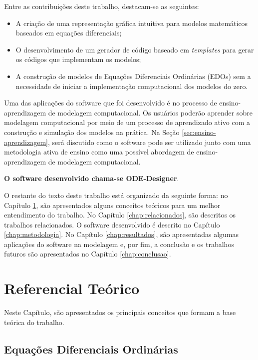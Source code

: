 \documentclass[
	12pt,				%
	openright,			%
	oneside,			%
	a4paper,			%
	main=brazil,
	english,			%
	]{ufsj-abntex2}
\begin{document}
Entre as contribuições deste trabalho, destacam-se as seguintes: 

\begin{itemize}
    \item A criação de uma representação gráfica intuitiva para modelos matemáticos baseados em equações diferenciais; 
    \item O desenvolvimento de um gerador de código baseado em \textit{templates} para gerar os códigos que implementam os modelos; 
    \item A construção de modelos de Equações Diferenciais Ordinárias (EDOs) sem a necessidade de iniciar a implementação computacional dos modelos do zero.
\end{itemize}

Uma das aplicações do software que foi desenvolvido é no processo de ensino-aprendizagem de modelagem computacional. Os usuários poderão aprender sobre modelagem computacional por meio de um processo de aprendizado ativo com a construção e simulação dos modelos na prática. Na Seção \ref{sec:ensino-aprendizagem}, será discutido como o software pode ser utilizado junto com uma metodologia ativa de ensino como uma possível abordagem de ensino-aprendizagem de modelagem computacional.  

\textbf{O software desenvolvido chama-se ODE-Designer}.

O restante do texto deste trabalho está organizado da seguinte forma: no Capítulo \ref{chap:referencial}, são apresentados alguns conceitos teóricos para um melhor entendimento do trabalho. No Capítulo \ref{chap:relacionados}, são descritos os trabalhos relacionados. O software desenvolvido é descrito no Capítulo \ref{chap:metodologia}. No Capítulo \ref{chap:resultados}, são apresentadas algumas aplicações do software na modelagem e, por fim, a conclusão e os trabalhos futuros são apresentados no Capítulo \ref{chap:conclusao}. 

\chapter{Referencial Teórico}
\label{chap:referencial}

Neste Capítulo, são apresentados os principais conceitos que formam a base teórica do trabalho. 

\section{Equações Diferenciais Ordinárias}\label{sec:edos}
\end{document}
